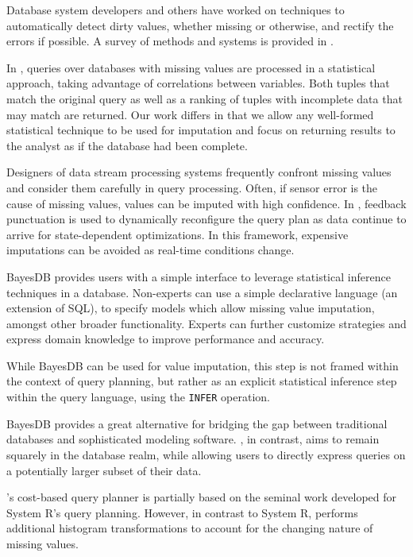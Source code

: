 Database system developers and others have worked on techniques to automatically
detect dirty values, whether missing or otherwise, and rectify the errors if
possible. A survey of methods and systems is provided in
\cite{hellerstein2008quantitative}.

In \cite{wolf2007query}, queries over databases with missing values are
processed in a statistical approach, taking advantage of correlations between
variables. Both tuples that match the original query as well as a ranking of
tuples with incomplete data that may match are returned. Our work differs in
that we allow any well-formed statistical technique to be used for imputation
and focus on returning results to the analyst as if the database had been
complete.

Designers of data stream processing systems frequently confront missing values
and consider them carefully in query processing. Often, if sensor error is the
cause of missing values, values can be imputed with high confidence. In
\cite{fernandez2009inter}, feedback punctuation is used to dynamically
reconfigure the query plan as data continue to arrive for state-dependent
optimizations. In this framework, expensive imputations can be avoided as
real-time conditions change.

BayesDB \cite{mansinghka2015bayesdb} provides users with a simple interface to 
leverage statistical inference techniques in a database. Non-experts
can use a simple declarative language (an extension of SQL), to specify models
which allow missing value imputation, amongst other broader functionality.
Experts can further customize strategies and express domain knowledge to
improve performance and accuracy.

While BayesDB can be used for value imputation, this step is not framed
within the context of query planning, but rather as an explicit statistical
inference step within the query language, using the \verb|INFER| operation. 

BayesDB provides a great alternative for bridging the gap between
traditional databases and sophisticated modeling software. \ProjectName{}, in
contrast, aims to remain squarely in the database realm, while allowing
users to directly express queries on a potentially larger subset of their data.

\ProjectName's cost-based query planner 
is partially based on the seminal work developed for System R's query planning\cite{blasgen1981system}.
However, in contrast to System R, \ProjectName{} performs additional histogram transformations to account
for the changing nature of missing values.

